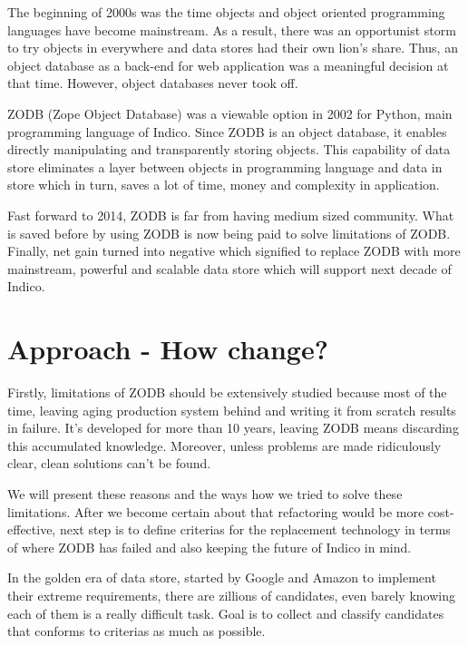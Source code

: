 \par The beginning of 2000s was the time objects and object oriented programming languages have become mainstream. As a result, there was an opportunist storm to try objects in everywhere and data stores had their own lion's share. Thus, an object database as a back-end for web application was a meaningful decision at that time. However, object databases never took off.

\par ZODB (Zope Object Database) was a viewable option in 2002 for Python, main programming language of Indico. Since ZODB is an object database, it enables directly manipulating and transparently storing objects. This capability of data store eliminates a layer between objects in programming language and data in store which in turn, saves a lot of time, money and complexity in application.

\par Fast forward to 2014, ZODB is far from having medium sized community. What is saved before by using ZODB is now being paid to solve limitations of ZODB. Finally, net gain turned into negative which signified to replace ZODB with more mainstream, powerful and scalable data store which will support next decade of Indico.

\section{Approach - How change?}

\par Firstly, limitations of ZODB should be extensively studied because most of the time, leaving aging production system behind and writing it from scratch results in failure. It's developed for more than 10 years, leaving ZODB means discarding this accumulated knowledge. Moreover, unless problems are made ridiculously clear, clean solutions can't be found.

\par We will present these reasons and the ways how we tried to solve these limitations. After we become certain about that refactoring would be more cost-effective, next step is to define criterias for the replacement technology in terms of where ZODB has failed and also keeping the future of Indico in mind. 

\par In the golden era of data store, started by Google and Amazon to implement their extreme requirements, there are zillions of candidates, even barely knowing each of them is a really difficult task. Goal is to collect and classify candidates that conforms to criterias as much as possible.

